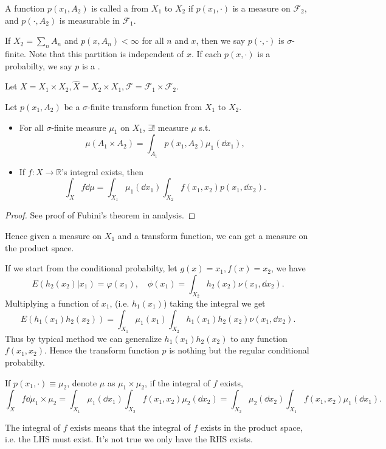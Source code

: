 \begin{definition}
	A function $p(x_1, A_2)$ is called a 
	from $X_1$ to $X_2$ if $p(x_1, \cdot)$ is a measure on $\mathscr{F}_2$,
	and $p(\cdot, A_2)$ is measurable in $\mathscr{F}_1$.
\end{definition}
If $X_2 = \sum_{n} A_n$ and $p(x, A_n) < \infty$ for all $n$ and $x$,
then we say $p(\cdot, \cdot)$ is $\sigma$-finite.
Note that this partition is independent of $x$.
If each $p(x, \cdot)$ is a probabilty, we say $p$ is a
.

Let $X = X_1 \times X_2, \hat{X} = X_2\times X_1,
\mathscr{F} = \mathscr{F}_1 \times \mathscr{F}_2$.

\begin{theorem}
    Let $p(x_1, A_2)$ be a $\sigma$-finite transform function from $X_1$ to $X_2$.
	\begin{itemize}
		\item For all $\sigma$-finite measure  $\mu_1$ on $X_1$, $\exists !$ measure
			$\mu$ s.t.
			\[
			\mu(A_1 \times  A_2) = \int_{A_1} p(x_1, A_2)\mu_1(\dd x_1),
			\]
		\item If $f: X\to \mathbb{R}$'s integral exists, then
			\[
			\int_X f\dd \mu = \int_{X_1}\mu_1(\dd x_1)
			\int_{X_2}f(x_1, x_2)p(x_1, \dd x_2).
			\]
	\end{itemize}
\end{theorem}
\begin{proof}[Proof]
    See proof of Fubini's theorem in analysis.
\end{proof}

Hence given a measure on $X_1$ and a transform function, we can get a
measure on the product space.

If we start from the conditional probabilty, let $g(x) = x_1, f(x) = x_2$,
we have
\[
E(h_2(x_2)| x_1) = \varphi(x_1), \quad \phi(x_1) =\int_{X_2}h_2(x_2)\nu(x_1, \dd x_2).
\]
Multiplying a function of $x_1$, (i.e. $h_1(x_1)$) taking the integral we get
\[
E(h_1(x_1)h_2(x_2)) = \int_{X_1} \mu_1(x_1)
\int_{X_2} h_1(x_1)h_2(x_2)\nu(x_1, \dd x_2).
\]
Thus by typical method we can generalize $h_1(x_1)h_2(x_2)$ to any
function $f(x_1, x_2)$.
Hence the transform function $p$ is nothing but the regular conditional probabilty.

\begin{corollary}
    If $p(x_1, \cdot) \equiv \mu_2$, denote $\mu$ as $\mu_1 \times \mu_2$,
	if the integral of $f$ exists,
	\[
	\int_X f\dd \mu_1 \times \mu_2 = \int_{X_1}\mu_1(\dd x_1)\int_{X_2}f(x_1, x_2)
	\mu_2(\dd x_2) = \int_{X_2}\mu_2(\dd x_2)\int_{X_1}f(x_1, x_2)\mu_1(\dd x_1).
	\]
\end{corollary}
\begin{remark}
    The integral of $f$ exists means that the integral of $f$ exists in
	the product space, i.e. the LHS must exist.
	It's not true we only have the RHS exists.
\end{remark}

